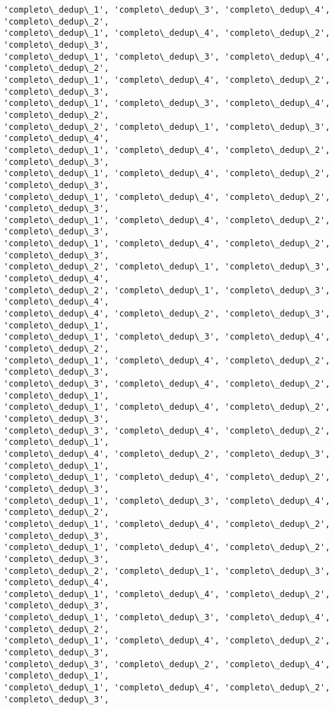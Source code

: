 \documentclass[11pt]{article}
\begin{document}
\begin{Verbatim}[commandchars=\\\{\}]
'completo\_dedup\_1', 'completo\_dedup\_3', 'completo\_dedup\_4', 'completo\_dedup\_2',
'completo\_dedup\_1', 'completo\_dedup\_4', 'completo\_dedup\_2', 'completo\_dedup\_3',
'completo\_dedup\_1', 'completo\_dedup\_3', 'completo\_dedup\_4', 'completo\_dedup\_2',
'completo\_dedup\_1', 'completo\_dedup\_4', 'completo\_dedup\_2', 'completo\_dedup\_3',
'completo\_dedup\_1', 'completo\_dedup\_3', 'completo\_dedup\_4', 'completo\_dedup\_2',
'completo\_dedup\_2', 'completo\_dedup\_1', 'completo\_dedup\_3', 'completo\_dedup\_4',
'completo\_dedup\_1', 'completo\_dedup\_4', 'completo\_dedup\_2', 'completo\_dedup\_3',
'completo\_dedup\_1', 'completo\_dedup\_4', 'completo\_dedup\_2', 'completo\_dedup\_3',
'completo\_dedup\_1', 'completo\_dedup\_4', 'completo\_dedup\_2', 'completo\_dedup\_3',
'completo\_dedup\_1', 'completo\_dedup\_4', 'completo\_dedup\_2', 'completo\_dedup\_3',
'completo\_dedup\_1', 'completo\_dedup\_4', 'completo\_dedup\_2', 'completo\_dedup\_3',
'completo\_dedup\_2', 'completo\_dedup\_1', 'completo\_dedup\_3', 'completo\_dedup\_4',
'completo\_dedup\_2', 'completo\_dedup\_1', 'completo\_dedup\_3', 'completo\_dedup\_4',
'completo\_dedup\_4', 'completo\_dedup\_2', 'completo\_dedup\_3', 'completo\_dedup\_1',
'completo\_dedup\_1', 'completo\_dedup\_3', 'completo\_dedup\_4', 'completo\_dedup\_2',
'completo\_dedup\_1', 'completo\_dedup\_4', 'completo\_dedup\_2', 'completo\_dedup\_3',
'completo\_dedup\_3', 'completo\_dedup\_4', 'completo\_dedup\_2', 'completo\_dedup\_1',
'completo\_dedup\_1', 'completo\_dedup\_4', 'completo\_dedup\_2', 'completo\_dedup\_3',
'completo\_dedup\_3', 'completo\_dedup\_4', 'completo\_dedup\_2', 'completo\_dedup\_1',
'completo\_dedup\_4', 'completo\_dedup\_2', 'completo\_dedup\_3', 'completo\_dedup\_1',
'completo\_dedup\_1', 'completo\_dedup\_4', 'completo\_dedup\_2', 'completo\_dedup\_3',
'completo\_dedup\_1', 'completo\_dedup\_3', 'completo\_dedup\_4', 'completo\_dedup\_2',
'completo\_dedup\_1', 'completo\_dedup\_4', 'completo\_dedup\_2', 'completo\_dedup\_3',
'completo\_dedup\_1', 'completo\_dedup\_4', 'completo\_dedup\_2', 'completo\_dedup\_3',
'completo\_dedup\_2', 'completo\_dedup\_1', 'completo\_dedup\_3', 'completo\_dedup\_4',
'completo\_dedup\_1', 'completo\_dedup\_4', 'completo\_dedup\_2', 'completo\_dedup\_3',
'completo\_dedup\_1', 'completo\_dedup\_3', 'completo\_dedup\_4', 'completo\_dedup\_2',
'completo\_dedup\_1', 'completo\_dedup\_4', 'completo\_dedup\_2', 'completo\_dedup\_3',
'completo\_dedup\_3', 'completo\_dedup\_2', 'completo\_dedup\_4', 'completo\_dedup\_1',
'completo\_dedup\_1', 'completo\_dedup\_4', 'completo\_dedup\_2', 'completo\_dedup\_3',

\end{Verbatim}
\end{document}
